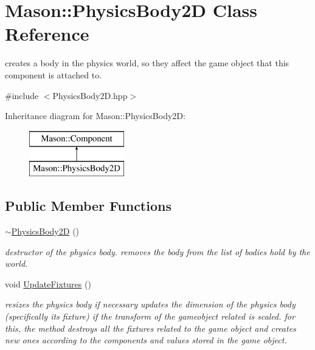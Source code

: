 \hypertarget{class_mason_1_1_physics_body2_d}{}\section{Mason\+:\+:Physics\+Body2D Class Reference}
\label{class_mason_1_1_physics_body2_d}


creates a body in the physics world, so they affect the game object that this component is attached to.  




{\ttfamily \#include $<$Physics\+Body2\+D.\+hpp$>$}

Inheritance diagram for Mason\+:\+:Physics\+Body2D\+:\begin{figure}[H]
\begin{center}
\leavevmode
\includegraphics[height=2.000000cm]{class_mason_1_1_physics_body2_d}
\end{center}
\end{figure}
\subsection*{Public Member Functions}
\begin{DoxyCompactItemize}
\item 
\hyperlink{class_mason_1_1_physics_body2_d_a9cd23100f41c0ae3dbce853e88f804e1}{$\sim$\+Physics\+Body2D} ()
\begin{DoxyCompactList}\small\item\em destructor of the physics body. removes the body from the list of bodies hold by the world. \end{DoxyCompactList}\item 
void \hyperlink{class_mason_1_1_physics_body2_d_adabfbe103ece98e01024752ef939158d}{Update\+Fixtures} ()
\begin{DoxyCompactList}\small\item\em resizes the physics body if necessary updates the dimension of the physics body (specifically its fixture) if the transform of the gameobject related is scaled. for this, the method destroys all the fixtures related to the game object and creates new ones according to the components and values stored in the game object. \end{DoxyCompactList}\end{DoxyCompactItemize}
